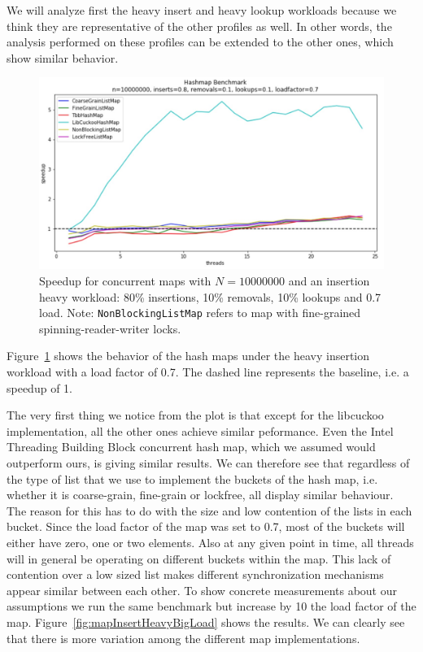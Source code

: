 \documentclass[11pt]{article}
\begin{document}
We will analyze first the heavy insert and heavy lookup workloads because we
think they are representative of the other profiles as well. In other words,
the analysis performed on these profiles can be extended to the
other ones, which show similar behavior.

\begin{figure}[!htb]
\centering
\includegraphics[width=1.0\linewidth]{figs/patricio/latedays/inserts_heavy.jpg}
\caption{
Speedup for concurrent maps with $N=10000000$ and an insertion heavy workload:
80\% insertions, 10\% removals, 10\% lookups and 0.7 load. Note:
{\tt NonBlockingListMap} refers to map with fine-grained spinning-reader-writer locks.}
\label{fig:mapInsertHeavy}
\end{figure}

Figure~\ref{fig:mapInsertHeavy} shows the behavior of the hash maps under the
heavy insertion workload with a load factor of 0.7. The dashed line represents
the baseline, i.e. a speedup of 1.

The very first thing we notice from the plot is that except for the libcuckoo
implementation, all the other ones achieve similar peformance. Even the Intel
Threading Building Block concurrent hash map, which we assumed would
outperform ours, is giving similar results. We can therefore see that regardless of the
type of list that we use to implement the buckets of the hash map, i.e. whether
it is coarse-grain, fine-grain or lockfree, all display similar behaviour.
The reason for this has to do with the size and low contention of the lists in each bucket.
Since the load factor of the map was set to 0.7, most of the buckets
will either have zero, one or two elements. Also at any given point in time, all threads
will in general be operating on different buckets within the map. This lack
of contention over a low sized list makes different synchronization mechanisms
appear similar between each other. To show concrete measurements about our assumptions
we run the same benchmark but increase by 10 the load factor of the map.
Figure~\ref{fig:mapInsertHeavyBigLoad} shows the results. We can clearly see that there
is more variation among the different map implementations.
\end{document}
